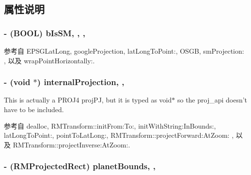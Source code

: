 \subsection{属性说明}
\hypertarget{interface_r_m_projection_ae3bbbad9dab3512aa9c53ae69f07051c}{
\subsubsection[{b\-Is\-S\-M}]{\setlength{\rightskip}{0pt plus 5cm}-\/ (B\-O\-O\-L) b\-Is\-S\-M\hspace{0.3cm}{\ttfamily [read]}, {\ttfamily [write]}, {\ttfamily [atomic]}, {\ttfamily [assign]}}}\label{interface_r_m_projection_ae3bbbad9dab3512aa9c53ae69f07051c}


参考自 E\-P\-S\-G\-Lat\-Long, google\-Projection, lat\-Long\-To\-Point\-:, O\-S\-G\-B, sm\-Projection\-: , 以及 wrap\-Point\-Horizontally\-:.

\hypertarget{interface_r_m_projection_a3fc7b131094967bb922e4d222f809c08}{
\subsubsection[{internal\-Projection}]{\setlength{\rightskip}{0pt plus 5cm}-\/ (void $\ast$) internal\-Projection\hspace{0.3cm}{\ttfamily [read]}, {\ttfamily [atomic]}, {\ttfamily [assign]}}}\label{interface_r_m_projection_a3fc7b131094967bb922e4d222f809c08}


This is actually a P\-R\-O\-J4 proj\-P\-J, but it is typed as void$\ast$ so the proj\-\_\-api doesn't have to be included. 



参考自 dealloc, R\-M\-Transform\-::init\-From\-:\-To\-:, init\-With\-String\-:\-In\-Bounds\-:, lat\-Long\-To\-Point\-:, point\-To\-Lat\-Long\-:, R\-M\-Transform\-::project\-Forward\-:\-At\-Zoom\-: , 以及 R\-M\-Transform\-::project\-Inverse\-:\-At\-Zoom\-:.

\hypertarget{interface_r_m_projection_aecfffc0acd70c575869e1b13193b2f9f}{
\subsubsection[{planet\-Bounds}]{\setlength{\rightskip}{0pt plus 5cm}-\/ ({\bf R\-M\-Projected\-Rect}) planet\-Bounds\hspace{0.3cm}{\ttfamily [read]}, {\ttfamily [atomic]}, {\ttfamily [assign]}}}\label{interface_r_m_projection_aecfffc0acd70c575869e1b13193b2f9f}


